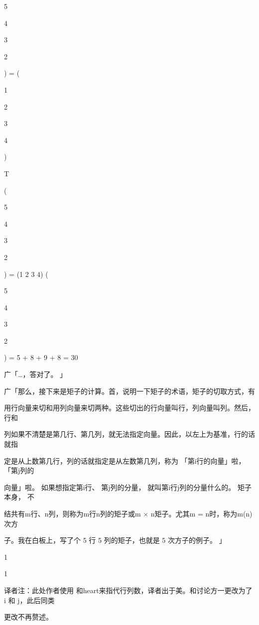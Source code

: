 5\par
4\par
3\par
2\par
) = (\par
1\par
2\par
3\par
4\par
)\par
T\par
(\par
5\par
4\par
3\par
2\par
) = (1 2 3 4) (\par
5\par
4\par
3\par
2\par
) = 5 + 8 + 9 + 8 = 30\par
广「…，答对了。 」\par
广「那么，接下来是矩子的计算。首，说明一下矩子的术语，矩子的切取方式，有\par
用行向量来切和用列向量来切两种。这些切出的行向量叫行，列向量叫列。然后，行和\par
列如果不清楚是第几行、第几列，就无法指定向量。因此，以左上为基准，行的话就指\par
定是从上数第几行，列的话就指定是从左数第几列，称为 「第i行的向量」啦， 「第j列的\par
向量」啦。 如果想指定第i行、 第j列的分量， 就叫第i行j列的分量什么的。 矩子本身， 不\par
结共有m行、n列，则称为m行n列的矩子或m $\times$ n矩子。尤其m = n时，称为m(n)次方\par
子。我在白板上，写了个 5 行 5 列的矩子，也就是 5 次方子的例子。 」\par
1\par
1\par
译者注：此处作者使用   和heart来指代行列数，译者出于美。和讨论方一更改为了 i 和 j，此后同类\par
更改不再赘述。\par

